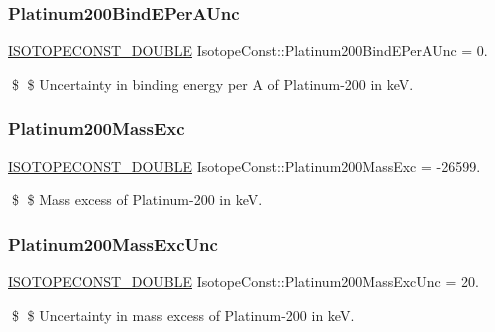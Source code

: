 \subsubsection{\texorpdfstring{Platinum200\+Bind\+E\+Per\+A\+Unc}{Platinum200BindEPerAUnc}}
{\footnotesize\ttfamily \mbox{\hyperlink{group___isotope_const-_macros_ga8f45a7272ce02c0b4c65c44636ed719a}{I\+S\+O\+T\+O\+P\+E\+C\+O\+N\+S\+T\+\_\+\+D\+O\+U\+B\+LE}} Isotope\+Const\+::\+Platinum200\+Bind\+E\+Per\+A\+Unc = 0.}

\$ \$ Uncertainty in binding energy per A of Platinum-\/200 in keV. \mbox{\label{group___isotope_const-_platinum-_pt200_ga9a860449daf70ae079b7e221f1f6c2c1}} 
\subsubsection{\texorpdfstring{Platinum200\+Mass\+Exc}{Platinum200MassExc}}
{\footnotesize\ttfamily \mbox{\hyperlink{group___isotope_const-_macros_ga8f45a7272ce02c0b4c65c44636ed719a}{I\+S\+O\+T\+O\+P\+E\+C\+O\+N\+S\+T\+\_\+\+D\+O\+U\+B\+LE}} Isotope\+Const\+::\+Platinum200\+Mass\+Exc = -\/26599.}

\$ \$ Mass excess of Platinum-\/200 in keV. \mbox{\label{group___isotope_const-_platinum-_pt200_ga3457809ae6cc8d4ba6c8777d591c2cf0}} 
\subsubsection{\texorpdfstring{Platinum200\+Mass\+Exc\+Unc}{Platinum200MassExcUnc}}
{\footnotesize\ttfamily \mbox{\hyperlink{group___isotope_const-_macros_ga8f45a7272ce02c0b4c65c44636ed719a}{I\+S\+O\+T\+O\+P\+E\+C\+O\+N\+S\+T\+\_\+\+D\+O\+U\+B\+LE}} Isotope\+Const\+::\+Platinum200\+Mass\+Exc\+Unc = 20.}

\$ \$ Uncertainty in mass excess of Platinum-\/200 in keV. \mbox{\label{group___isotope_const-_platinum-_pt200_ga817a856a1b7abe7c462949c0d42c45d3}} 
